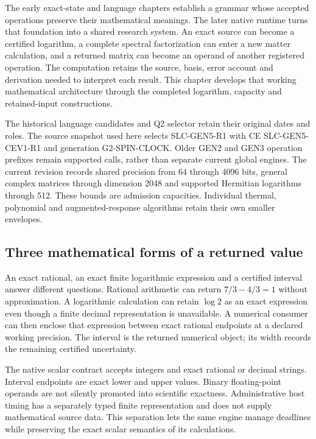 \label{v3-runtime-native}

The early exact-state and language chapters establish a grammar whose accepted operations preserve their mathematical meanings. The later native runtime turns that foundation into a shared research system. An exact source can become a certified logarithm, a complete spectral factorization can enter a new matter calculation, and a returned matrix can become an operand of another registered operation. The computation retains the source, basis, error account and derivation needed to interpret each result. This chapter develops that working mathematical architecture through the completed logarithm, capacity and retained-input constructions.

The historical language candidates and Q2 selector retain their original dates and roles. The source snapshot used here selects SLC-GEN5-R1 with CE SLC-GEN5-CEV1-R1 and generation G2-SPIN-CLOCK. Older GEN2 and GEN3 operation prefixes remain supported calls, rather than separate current global engines. The current revision records shared precision from 64 through 4096 bits, general complex matrices through dimension 2048 and supported Hermitian logarithms through 512. These bounds are admission capacities. Individual thermal, polynomial and augmented-response algorithms retain their own smaller envelopes.

\subsection{Three mathematical forms of a returned value}
\label{v3-runtime-value-types}

An exact rational, an exact finite logarithmic expression and a certified interval answer different questions. Rational arithmetic can return $7/3-4/3=1$ without approximation. A logarithmic calculation can retain $\log2$ as an exact expression even though a finite decimal representation is unavailable. A numerical consumer can then enclose that expression between exact rational endpoints at a declared working precision. The interval is the returned numerical object; its width records the remaining certified uncertainty.

The native scalar contract accepts integers and exact rational or decimal strings. Interval endpoints are exact lower and upper values. Binary floating-point operands are not silently promoted into scientific exactness. Administrative host timing has a separately typed finite representation and does not supply mathematical source data. This separation lets the same engine manage deadlines while preserving the exact scalar semantics of its calculations.

